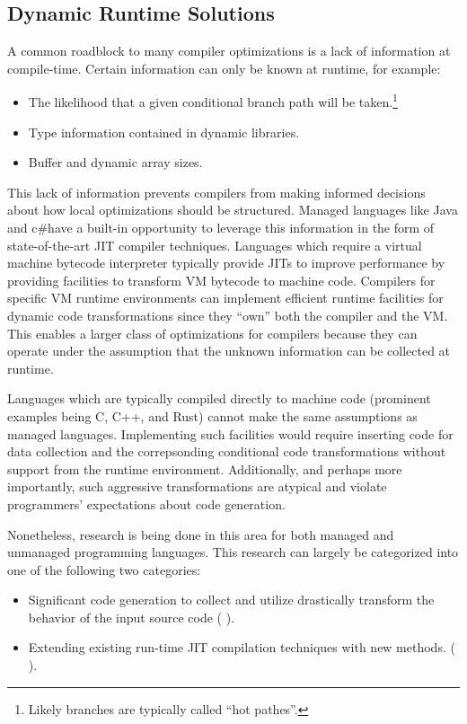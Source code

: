 \documentclass[nobib]{tufte-handout}
\newcommand{\placeholdertext}[1]{
	\noindent{\color{red}{#1}}
}
\newcommand{\csharp}{c\#}
\begin{document}
\subsection{Dynamic Runtime Solutions}
A common roadblock to many compiler optimizations is a lack of information at compile-time.  Certain information can only be known at runtime, for example: 
\begin{itemize}
\item The likelihood that a given conditional branch path will be taken.\footnote{Likely branches are typically called ``hot pathes''.}
\item Type information contained in dynamic libraries.
\item Buffer and dynamic array sizes.
\end{itemize}

This lack of information prevents compilers from making informed decisions about how local optimizations should be structured.  Managed languages like Java and \csharp have a built-in opportunity to leverage this information in the form of state-of-the-art JIT compiler techniques.  Languages which require a virtual machine bytecode interpreter typically provide JITs to improve performance by providing facilities to transform VM bytecode to machine code.  Compilers for specific VM runtime environments can implement efficient runtime facilities for dynamic code transformations since they ``own'' both the compiler and the VM.  This enables a larger class of optimizations for compilers because they can operate under the assumption that the unknown information can be collected at runtime.

Languages which are typically compiled directly to machine code (prominent examples being C, C++, and Rust) cannot make the same assumptions as managed languages.  Implementing such facilities would require inserting code for data collection and the correpsonding conditional code transformations without support from the runtime environment.  Additionally, and perhaps more importantly, such aggressive transformations are atypical and violate programmers' expectations about code generation.  

Nonetheless, research is being done in this area for both managed and unmanaged programming languages.  This research can largely be categorized into one of the following two categories:
\begin{itemize}
\item Significant code generation to collect and utilize drastically transform the behavior of the input source code (\placeholdertext{WHOMST?}).
\item Extending existing run-time JIT compilation techniques with new methods. (\placeholdertext{WHOMST'D?}).
\end{itemize}
\end{document}
